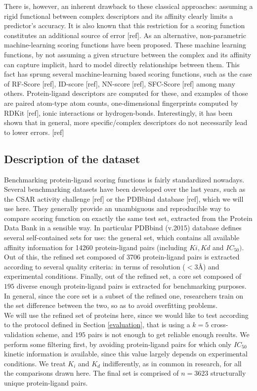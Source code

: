 \documentclass[10pt,a4paper,twoside]{book}
\begin{document}
There is, however, an inherent drawback to these classical approaches: assuming a rigid functional between complex descriptors and its affinity clearly limits a predictor's accuracy. It is also known that this restriction for a scoring function constitutes an additional source of error [ref]. As an alternative, non-parametric machine-learning scoring functions have been proposed. These machine learning functions, by not assuming a given structure between the complex and its affinity can capture implicit, hard to model directly relationships between them. This fact has sprung several machine-learning based scoring functions, such as the case of RF-Score [ref], ID-score [ref], NN-score [ref], SFC-Score [ref] among many others. Protein-ligand descriptors are computed for these, and examples of those are paired atom-type atom counts, one-dimensional fingerprints computed by RDKit [ref], ionic interactions or hydrogen-bonds. Interestingly, it has been shown that in general, more specific/complex descriptors do not necessarily lead to lower errors. [ref]

\subsection{Description of the dataset}

Benchmarking protein-ligand scoring functions is fairly standardized nowadays. Several benchmarking datasets have been developed over the last years, such as the CSAR activity challenge [ref] or the PDBbind database [ref], which we will use here. They generally provide an unambiguous and reproducible way to compare scoring function on exactly the same test set, extracted from the Protein Data Bank in a sensible way. In particular PDBbind (v.2015) database defines several self-contained sets for use: the general set, which contains all available affinity information for 14260 protein-ligand pairs (including $Ki, Kd$ and $IC_{50})$. Out of this, the refined set composed of 3706  protein-ligand pairs is extracted according to several quality criteria: in terms of resolution ($<3$\AA) and experimental conditions. Finally, out of the refined set, a core set composed of $195$ diverse enough protein-ligand pairs is extracted for benchmarking purposes. In general, since the core set is a subset of the refined one, researchers train on the set difference between the two, so as to avoid overfitting problems.\\

We will use the refined set of proteins here, since we would like to test according to the protocol defined in Section \ref{evaluation}, that is using a $k=5$ cross-validation scheme, and $195$ pairs is not enough to get reliable enough results. We perform some filtering first, by avoiding protein-ligand pairs for which only $IC_{50}$ kinetic information is available, since this value largely depends on experimental conditions. We treat $K_i$ and $K_d$ indifferently, as in common in research, for all the comparisons drawn here. The final set is comprised of $n=3623$ structurally unique protein-ligand pairs.\\
\end{document}
